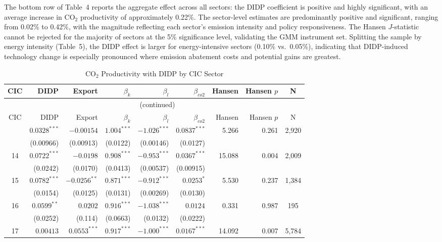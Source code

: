 \documentclass[11pt,a4paper]{article}
\begin{document}
The bottom row of Table~4 reports the aggregate effect across all sectors: the DIDP coefficient is positive and highly significant, with an average increase in CO$_2$ productivity of approximately 0.22\%. The sector-level estimates are predominantly positive and significant, ranging from 0.02\% to 0.42\%, with the magnitude reflecting each sector's emission intensity and policy responsiveness. The Hansen $J$-statistic cannot be rejected for the majority of sectors at the 5\% significance level, validating the GMM instrument set. Splitting the sample by energy intensity (Table~5), the DIDP effect is larger for energy-intensive sectors (0.10\% vs.\ 0.05\%), indicating that DIDP-induced technology change is especially pronounced where emission abatement costs and potential gains are greatest.

\begin{landscape}
\begin{longtable}{crrrrrrrc}
\caption{CO$_2$ Productivity with DIDP by CIC Sector}
\label{tab:co2_cic}\\
\toprule
CIC & DIDP & Export & $\beta_k$ & $\beta_l$ & $\beta_{co2}$ & Hansen & Hansen $p$ & N \\
\midrule
\endfirsthead
\multicolumn{9}{c}{\tablename\ \thetable{} (continued)}\\
\toprule
CIC & DIDP & Export & $\beta_k$ & $\beta_l$ & $\beta_{co2}$ & Hansen & Hansen $p$ & N \\
\midrule
\endhead
\bottomrule
\endfoot
13 & $0.0328^{***}$ & $-0.00154$ & $1.004^{***}$ & $-1.026^{***}$ & $0.0837^{***}$ & 5.266 & 0.261 & 2{,}920 \\
   & (0.00966) & (0.00913) & (0.0122) & (0.00146) & (0.0127) & & & \\
14 & $0.0722^{***}$ & $-0.0198$ & $0.908^{***}$ & $-0.953^{***}$ & $0.0367^{***}$ & 15.088 & 0.004 & 2{,}009 \\
   & (0.0242) & (0.0170) & (0.0413) & (0.00537) & (0.00915) & & & \\
15 & $0.0782^{***}$ & $-0.0256^{**}$ & $0.871^{***}$ & $-0.912^{***}$ & $0.0253^{*}$ & 5.530 & 0.237 & 1{,}384 \\
   & (0.0154) & (0.0125) & (0.0131) & (0.00269) & (0.0130) & & & \\
16 & $0.0599^{**}$ & $0.0202$ & $0.916^{***}$ & $-1.038^{***}$ & $0.0124$ & 0.331 & 0.987 & 195 \\
   & (0.0252) & (0.114) & (0.0663) & (0.0132) & (0.0222) & & & \\
17 & $0.00413$ & $0.0553^{***}$ & $0.917^{***}$ & $-1.000^{***}$ & $0.0167^{***}$ & 14.092 & 0.007 & 5{,}784 \\

\end{longtable}
\end{landscape}
\end{document}
